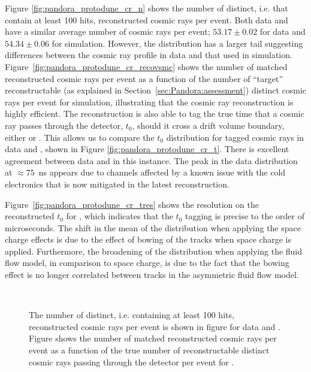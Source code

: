 Figure \ref{fig:pandora_protodune_cr_n} shows the number of distinct, i.e. that contain at least 100 hits, reconstructed cosmic rays per event.  Both data and  have a similar average number of cosmic rays per event; $53.17\pm0.02$ for data and $54.34\pm0.06$ for simulation.  However, the  distribution has a larger tail suggesting differences between the cosmic ray profile in data and that used in simulation. Figure~\ref{fig:pandora_protodune_cr_recovsmc} shows the number of matched reconstructed cosmic rays per event as a function of the number of ``target'' reconstructable (as explained in Section~\ref{sec:Pandora:assessment}) distinct cosmic rays per event for  simulation, illustrating that the  cosmic ray reconstruction is highly efficient.  The  reconstruction is also able to tag the true time that a cosmic ray passes through the detector, $t_{0}$, should it cross a drift volume boundary, either  or .  This allows us to compare the $t_{0}$ distribution for tagged cosmic rays in data and , shown in Figure \ref{fig:pandora_protodune_cr_t}.  There is excellent agreement between data and  in this instance.  The peak in the data distribution at $\approx 75$~ns appears due to channels affected by a known issue with the cold electronics that is now mitigated in the latest reconstruction.

Figure~\ref{fig:pandora_protodune_cr_tres} shows the resolution on the reconstructed $t_{0}$ for , which indicates that the  $t_{0}$ tagging is precise to the order of microseconds.  The shift in the mean of the distribution when applying the space charge effects is due to the effect of bowing of the tracks when space charge is applied.  Furthermore, the broadening of the distribution when applying the fluid flow model, in comparison to space charge, is due to the fact that the bowing effect is no longer correlated between tracks in the asymmetric fluid flow model.

\begin{figure}[!ht]
\centering
{}
 \\
\caption[Reconstructed cosmic rays per event for data and ]{The number of distinct, i.e. containing at least 100 hits, reconstructed cosmic rays per event is shown in figure \protect{} for data and .  Figure \protect{} shows the number of matched reconstructed cosmic rays per event as a function of the true number of reconstructable distinct cosmic rays passing through the detector per event for .}
\label{fig:pandora_protodune_cr_number}
\end{figure}

